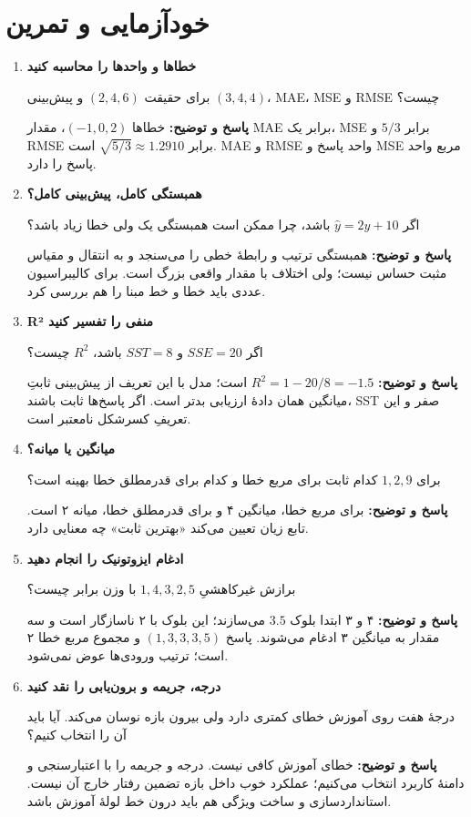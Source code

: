 \documentclass[12pt,a4paper,oneside]{report}
\newcounter{ex}[chapter]
\newenvironment{selftests}{\begin{enumerate}\setlength{\itemsep}{9pt}}{\end{enumerate}}
\newenvironment{selftest}[1]{\item\textbf{#1}\par}{\par}
\newcommand{\answer}[1]{\par{\color{teal}\bfseries پاسخ و توضیح: }#1\par}
\begin{document}
\section{خودآزمایی و تمرین}
\begin{selftests}
\begin{selftest}{خطاها و واحدها را محاسبه کنید}
برای حقیقت $(2,4,6)$ و پیش‌بینی $(3,4,4)$، MAE، MSE و RMSE چیست؟
\answer{خطاها $(-1,0,2)$، مقدار MAE برابر یک، MSE برابر $5/3$ و RMSE برابر $\sqrt{5/3}\approx1.2910$ است. MAE و RMSE واحد پاسخ و MSE مربع واحد پاسخ را دارد.}
\end{selftest}
\begin{selftest}{همبستگی کامل، پیش‌بینی کامل؟}
اگر $\widehat y=2y+10$ باشد، چرا ممکن است همبستگی یک ولی خطا زیاد باشد؟
\answer{همبستگی ترتیب و رابطهٔ خطی را می‌سنجد و به انتقال و مقیاس مثبت حساس نیست؛ ولی اختلاف با مقدار واقعی بزرگ است. برای کالیبراسیون عددی باید خطا و خط مبنا را هم بررسی کرد.}
\end{selftest}
\begin{selftest}{R² منفی را تفسیر کنید}
اگر $SSE=20$ و $SST=8$ باشد، $R^2$ چیست؟
\answer{$R^2=1-20/8=-1.5$ است؛ مدل با این تعریف از پیش‌بینی ثابتِ میانگین همان دادهٔ ارزیابی بدتر است. اگر پاسخ‌ها ثابت باشند، SST صفر و این تعریفِ کسرشکل نامعتبر است.}
\end{selftest}
\begin{selftest}{میانگین یا میانه؟}
برای $1,2,9$ کدام ثابت برای مربع خطا و کدام برای قدرمطلق خطا بهینه است؟
\answer{برای مربع خطا، میانگین ۴ و برای قدرمطلق خطا، میانه ۲ است. تابع زیان تعیین می‌کند «بهترین ثابت» چه معنایی دارد.}
\end{selftest}
\begin{selftest}{ادغام ایزوتونیک را انجام دهید}
برازش غیرکاهشیِ $1,4,3,2,5$ با وزن برابر چیست؟
\answer{۴ و ۳ ابتدا بلوک $3.5$ می‌سازند؛ این بلوک با ۲ ناسازگار است و سه مقدار به میانگین ۳ ادغام می‌شوند. پاسخ $(1,3,3,3,5)$ و مجموع مربع خطا ۲ است؛ ترتیب ورودی‌ها عوض نمی‌شود.}
\end{selftest}
\begin{selftest}{درجه، جریمه و برون‌یابی را نقد کنید}
درجهٔ هفت روی آموزش خطای کمتری دارد ولی بیرون بازه نوسان می‌کند. آیا باید آن را انتخاب کنیم؟
\answer{خطای آموزش کافی نیست. درجه و جریمه را با اعتبارسنجی و دامنهٔ کاربرد انتخاب می‌کنیم؛ عملکرد خوب داخل بازه تضمین رفتار خارج آن نیست. استانداردسازی و ساخت ویژگی هم باید درون خط لولهٔ آموزش باشد.}
\end{selftest}
\end{selftests}

\end{document}

